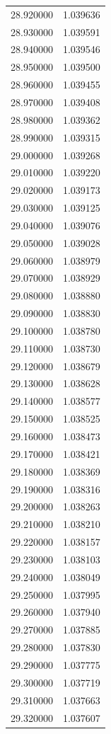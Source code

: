 \begin{tabular}{rr}
28.920000 & 1.039636 \\
28.930000 & 1.039591 \\
28.940000 & 1.039546 \\
28.950000 & 1.039500 \\
28.960000 & 1.039455 \\
28.970000 & 1.039408 \\
28.980000 & 1.039362 \\
28.990000 & 1.039315 \\
29.000000 & 1.039268 \\
29.010000 & 1.039220 \\
29.020000 & 1.039173 \\
29.030000 & 1.039125 \\
29.040000 & 1.039076 \\
29.050000 & 1.039028 \\
29.060000 & 1.038979 \\
29.070000 & 1.038929 \\
29.080000 & 1.038880 \\
29.090000 & 1.038830 \\
29.100000 & 1.038780 \\
29.110000 & 1.038730 \\
29.120000 & 1.038679 \\
29.130000 & 1.038628 \\
29.140000 & 1.038577 \\
29.150000 & 1.038525 \\
29.160000 & 1.038473 \\
29.170000 & 1.038421 \\
29.180000 & 1.038369 \\
29.190000 & 1.038316 \\
29.200000 & 1.038263 \\
29.210000 & 1.038210 \\
29.220000 & 1.038157 \\
29.230000 & 1.038103 \\
29.240000 & 1.038049 \\
29.250000 & 1.037995 \\
29.260000 & 1.037940 \\
29.270000 & 1.037885 \\
29.280000 & 1.037830 \\
29.290000 & 1.037775 \\
29.300000 & 1.037719 \\
29.310000 & 1.037663 \\
29.320000 & 1.037607 \\

\end{tabular}
